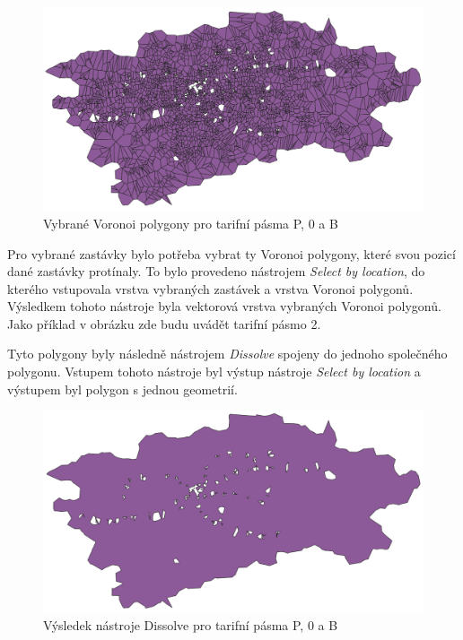 \begin{figure}[H] \centering
    \includegraphics[width=400pt]{./pictures/voronoi-selected-P0B.png}
    \caption[Vybrané Voronoi polygony pro tarifní pásma P, 0 a B]{Vybrané Voronoi polygony pro tarifní pásma P, 0 a B}
	\label{fig:voronoi-selected}              
\end{figure}

Pro vybrané zastávky bylo potřeba vybrat ty Voronoi polygony, které svou
pozicí dané zastávky protínaly. To bylo provedeno nástrojem \textit{Select by location},
do kterého vstupovala vrstva vybraných zastávek a vrstva Voronoi polygonů. Výsledkem tohoto nástroje byla
vektorová vrstva vybraných Voronoi polygonů. Jako příklad v obrázku zde budu uvádět tarifní pásmo 2.

Tyto polygony byly následně nástrojem \textit{Dissolve} spojeny do jednoho společného polygonu.
Vstupem tohoto nástroje byl výstup nástroje \textit{Select by location} a výstupem byl polygon
s jednou geometrií. 

\begin{figure}[H] \centering
    \includegraphics[width=400pt]{./pictures/dissolve-P0B.png}
    \caption[Výsledek nástroje Dissolve pro tarifní pásma P, 0 a B]{Výsledek nástroje Dissolve pro tarifní pásma P, 0 a B}
	\label{fig:dissolve}              
\end{figure} 


